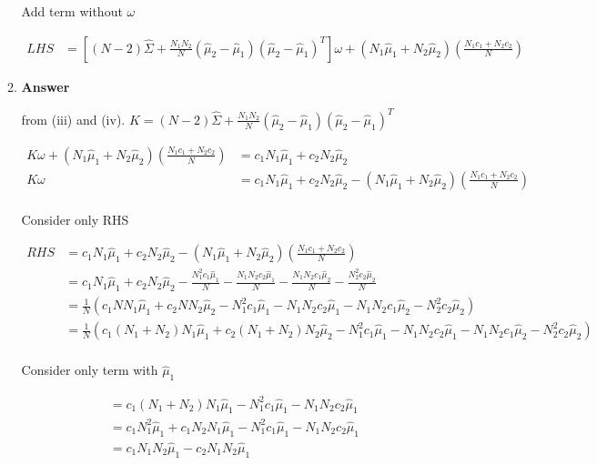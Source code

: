 \documentclass[11pt]{article}
\begin{document}
\begin{enumerate}[label=(\alph*)]
\begin{enumerate}[label=(\roman*)]
\newpage

Add term without $\omega$

\begin{align*}
LHS 
&= [(N-2)\hat{\Sigma}
+ \frac{N_1N_2}{N}(\hat{\mu}_2-\hat{\mu}_1)(\hat{\mu}_2-\hat{\mu}_1)^T
]\omega
+(N_1\hat{\mu}_1+N_2\hat{\mu}_2)
(\frac{N_1c_1+N_2c_2}{N})
\end{align*}

\item  \textbf{Answer}

from (iii) and (iv). $K=(N-2)\hat{\Sigma}+ \frac{N_1N_2}{N}(\hat{\mu}_2-\hat{\mu}_1)(\hat{\mu}_2-\hat{\mu}_1)^T$

\begin{align*}
K\omega+(N_1\hat{\mu}_1+N_2\hat{\mu}_2)
(\frac{N_1c_1+N_2c_2}{N})  &= c_1N_1\hat{\mu}_1+c_2N_2\hat{\mu}_2\\
K\omega  &= c_1N_1\hat{\mu}_1+c_2N_2\hat{\mu}_2
-(N_1\hat{\mu}_1+N_2\hat{\mu}_2)(\frac{N_1c_1+N_2c_2}{N})\\
\end{align*}

Consider only RHS

\begin{align*}
RHS &= c_1N_1\hat{\mu}_1+c_2N_2\hat{\mu}_2
-(N_1\hat{\mu}_1+N_2\hat{\mu}_2)(\frac{N_1c_1+N_2c_2}{N})\\
 &= c_1N_1\hat{\mu}_1+c_2N_2\hat{\mu}_2
- \frac{N_1^2c_1\hat{\mu}_1}{N}
- \frac{N_1N_2c_2\hat{\mu}_1}{N}
- \frac{N_1N_2c_1\hat{\mu}_2}{N}
- \frac{N_2^2c_2\hat{\mu}_2}{N}\\
&= \frac{1}{N}(
    c_1NN_1\hat{\mu}_1
+ c_2NN_2\hat{\mu}_2
- N_1^2c_1\hat{\mu}_1
- N_1N_2c_2\hat{\mu}_1
- N_1N_2c_1\hat{\mu}_2
- N_2^2c_2\hat{\mu}_2)\\
&= \frac{1}{N}(
    c_1(N_1+N_2)N_1\hat{\mu}_1
+ c_2(N_1+N_2)N_2\hat{\mu}_2
- N_1^2c_1\hat{\mu}_1
- N_1N_2c_2\hat{\mu}_1
- N_1N_2c_1\hat{\mu}_2
- N_2^2c_2\hat{\mu}_2)\\
\end{align*}

Consider only term with $\hat{\mu}_1$

\begin{align*}
&= c_1(N_1+N_2)N_1\hat{\mu}_1
- N_1^2c_1\hat{\mu}_1
- N_1N_2c_2\hat{\mu}_1\\
&= c_1N_1^2\hat{\mu}_1
+c_1N_2N_1\hat{\mu}_1
- N_1^2c_1\hat{\mu}_1
- N_1N_2c_2\hat{\mu}_1\\
&= c_1N_1N_2\hat{\mu}_1
- c_2N_1N_2\hat{\mu}_1\\
\end{align*}


\end{enumerate}
\end{enumerate}
\end{document}
